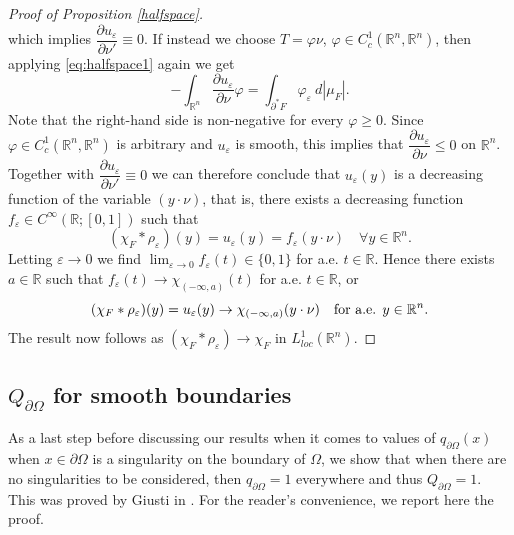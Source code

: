 \documentclass[artcle, 11pt, reqno]{amsart}
\numberwithin{equation}{section}
\newcommand{\R}{\mathbb{R}}
\newcommand{\pom}{{\partial \Omega}}
\newcommand{\dd}{\: d}
\theoremstyle{plain}
\theoremstyle{definition}
\theoremstyle{remark}
\begin{document}
\begin{proof}[Proof of Proposition \ref{halfspace}]
\[		\]
		which implies $\dfrac{\partial u_\varepsilon}{\partial \nu'} \equiv 0$. If instead we choose $T = \varphi \nu$, $\varphi \in C^1_c(\R^n, \R^n)$, then applying \eqref{eq:halfspace1} again we get
		\[
		-\int_{\R^n} \frac{\partial u_\varepsilon}{\partial \nu} \varphi = \int_{\partial^\ast F} \varphi_\varepsilon \dd |\mu_F|.
		\]
		Note that the right-hand side is non-negative for every $\varphi \geq 0$. Since $\varphi \in C^1_c(\R^n, \R^n)$ is arbitrary and $u_\varepsilon$ is smooth, this implies that $\dfrac{\partial u_\varepsilon}{\partial \nu} \leq 0$ on $\R^n$. Together with $\dfrac{\partial u_\varepsilon}{\partial \nu'} \equiv 0$ we can therefore conclude that $u_\varepsilon(y)$ is a decreasing function of the variable $(y \cdot \nu)$, that is, there exists a decreasing function $f_\varepsilon \in C^\infty(\R;[0,1])$ such that
		\[
		(\chi_F \ast \rho_\varepsilon)(y)=u_\varepsilon(y)=f_\varepsilon(y \cdot \nu) \quad \forall y \in \R^n.
		\]    
		Letting $\varepsilon \rightarrow0$ we find $\lim_{\varepsilon \rightarrow0} f_\varepsilon(t) \in \{0,1\}$ for a.e. $t \in \R$. Hence there exists $a \in \R$ such that $f_\varepsilon(t) \rightarrow\chi_{(-\infty, a)}(t)$ for a.e. $t \in \R$, or 
		\[
		(\chi_F \ast \rho_\varepsilon)(y) = u_\varepsilon(y) \rightarrow\chi_{(-\infty,a)}(y \cdot \nu) \quad \textnormal{for a.e. } y \in \R^n.
		\]
		The result now follows as $(\chi_F \ast \rho_\varepsilon) \rightarrow\chi_F$ in $L^1_{loc}(\R^n).$
	\end{proof}

	
	
	\subsection{$Q_\pom$ for smooth boundaries}
	As a last step before discussing our results when it comes to values of $q_\pom(x)$ when $x \in \pom$ is a singularity on the boundary of $\Omega$, we show that when there are no singularities to be considered, then $q_\pom = 1$ everywhere and thus $Q_\pom = 1$. This was proved by Giusti in \cite{giusti1976boundary}. For the reader's convenience, we report here the proof.
	
\end{document}
